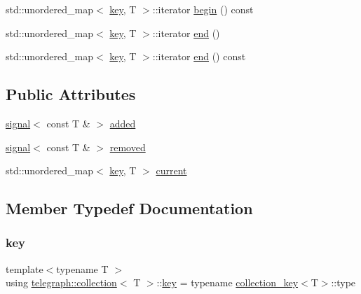 \begin{DoxyCompactItemize}
\item 
std\+::unordered\+\_\+map$<$ \hyperlink{classtelegraph_1_1collection_a7d1c05b1bdcbe95a3127122969e14173}{key}, T $>$\+::iterator \hyperlink{classtelegraph_1_1collection_a262da7d56b726b69ddee3de30f086066}{begin} () const
\item 
std\+::unordered\+\_\+map$<$ \hyperlink{classtelegraph_1_1collection_a7d1c05b1bdcbe95a3127122969e14173}{key}, T $>$\+::iterator \hyperlink{classtelegraph_1_1collection_a14b2edf6043f717d568342a1a7575132}{end} ()
\item 
std\+::unordered\+\_\+map$<$ \hyperlink{classtelegraph_1_1collection_a7d1c05b1bdcbe95a3127122969e14173}{key}, T $>$\+::iterator \hyperlink{classtelegraph_1_1collection_ae8833bbd79ee1d4bc8c4d4c949fc4532}{end} () const
\end{DoxyCompactItemize}
\subsection*{Public Attributes}
\begin{DoxyCompactItemize}
\item 
\hyperlink{classtelegraph_1_1signal}{signal}$<$ const T \& $>$ \hyperlink{classtelegraph_1_1collection_a7ac59f0f85680539f80d085dd35b3c47}{added}
\item 
\hyperlink{classtelegraph_1_1signal}{signal}$<$ const T \& $>$ \hyperlink{classtelegraph_1_1collection_a6fdb7502f6cef02065c6bbde435756f0}{removed}
\item 
std\+::unordered\+\_\+map$<$ \hyperlink{classtelegraph_1_1collection_a7d1c05b1bdcbe95a3127122969e14173}{key}, T $>$ \hyperlink{classtelegraph_1_1collection_a5a6329136af41edba2e17fddaaa5384c}{current}
\end{DoxyCompactItemize}


\subsection{Member Typedef Documentation}
\mbox{\label{classtelegraph_1_1collection_a7d1c05b1bdcbe95a3127122969e14173}} 
\subsubsection{\texorpdfstring{key}{key}}
{\footnotesize\ttfamily template$<$typename T $>$ \\
using \hyperlink{classtelegraph_1_1collection}{telegraph\+::collection}$<$ T $>$\+::\hyperlink{classtelegraph_1_1collection_a7d1c05b1bdcbe95a3127122969e14173}{key} =  typename \hyperlink{structtelegraph_1_1collection__key}{collection\+\_\+key}$<$T$>$\+::type}



